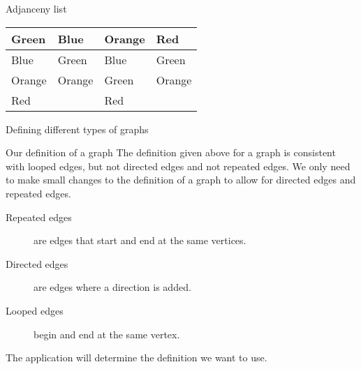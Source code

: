 \begin{frame}{Adjanceny list}
	\begin{center}
	\begin{tabular}{l|l|l|l}
	Green & Blue & Orange & Red \\
	\hline
	Blue & Green & Blue & Green \\
	Orange & Orange & Green & Orange \\
	Red & & Red & 
	\end{tabular}
	\end{center}
\end{frame}

\begin{frame}{Defining different types of graphs}
	
	\begin{block}{Our definition of a graph}
	The definition given above for a graph is consistent with looped edges, but not directed edges and not repeated edges. We only need to make small changes to the definition of a graph to allow for directed edges and repeated edges.
	\end{block}
	
	\begin{description}
		\item[Repeated edges] are edges that start and end at the same vertices.
		\item[Directed edges] are edges where a direction is added.
		\item[Looped edges] begin and end at the same vertex.
	\end{description}
	
	The application will determine the definition we want to use.
\end{frame}


